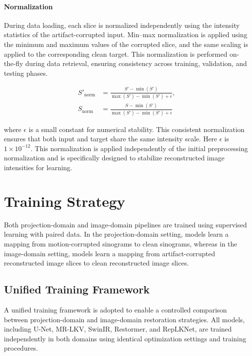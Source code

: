 \paragraph{Normalization}
During data loading, each slice is normalized independently using the intensity statistics of the artifact-corrupted input. Min–max normalization is applied using the minimum and maximum values of the corrupted slice, and the same scaling is applied to the corresponding clean target. This normalization is performed on-the-fly during data retrieval, ensuring consistency across training, validation, and testing phases.

\begin{equation}
\begin{aligned}
S'_{\mathrm{norm}} &= \frac{S' - \min(S')}{\max(S') - \min(S') + \epsilon}, \\
S_{\mathrm{norm}}  &= \frac{S - \min(S')}{\max(S') - \min(S') + \epsilon}
\end{aligned}
\end{equation}

where $\epsilon$ is a small constant for numerical stability. This consistent normalization ensures that both input and target share the same intensity scale. Here $\epsilon$ is $1 \times 10^{-12}$. This normalization is applied independently of the initial preprocessing normalization and is specifically designed to stabilize reconstructed image intensities for learning. 

\section{Training Strategy}

Both projection-domain and image-domain pipelines are trained using supervised learning with paired data. In the projection-domain setting, models learn a mapping from motion-corrupted sinograms to clean sinograms, whereas in the image-domain setting, models learn a mapping from artifact-corrupted reconstructed image slices to clean reconstructed image slices.

 \subsection{Unified Training Framework  }
 A unified training framework is adopted to enable a controlled comparison between projection-domain and image-domain restoration strategies. All models, including U-Net, MR-LKV, SwinIR, Restormer, and RepLKNet, are trained independently in both domains using identical optimization settings and training procedures.

